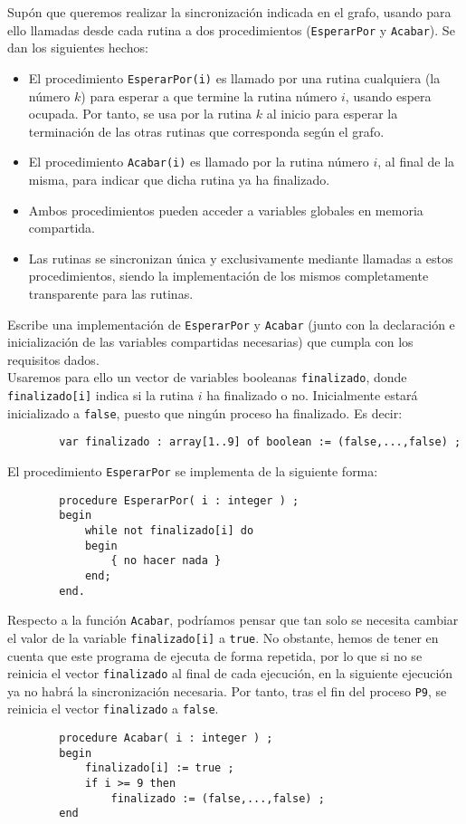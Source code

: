 \begin{ejercicio}
    Supón que queremos realizar la sincronización indicada en el grafo, usando para ello llamadas
    desde cada rutina a dos procedimientos (\verb|EsperarPor| y \verb|Acabar|). Se dan los siguientes hechos:
    \begin{itemize}
        \item El procedimiento \verb|EsperarPor(i)| es llamado por una rutina cualquiera (la número $k$) para esperar a que termine la rutina número $i$, usando espera ocupada. Por tanto, se usa por la rutina $k$ al inicio para esperar la terminación de las otras rutinas que corresponda según el grafo.
        \item El procedimiento \verb|Acabar(i)| es llamado por la rutina número $i$, al final de la misma, para indicar que dicha rutina ya ha finalizado.
        \item Ambos procedimientos pueden acceder a variables globales en memoria compartida.
        \item Las rutinas se sincronizan única y exclusivamente mediante llamadas a estos procedimientos, siendo la implementación de los mismos completamente transparente para las rutinas.
    \end{itemize}
    Escribe una implementación de \verb|EsperarPor| y \verb|Acabar| (junto con la declaración e inicialización de las variables compartidas necesarias) que cumpla con los requisitos dados.\\

    Usaremos para ello un vector de variables booleanas \verb|finalizado|, donde \verb|finalizado[i]| indica si la rutina $i$ ha finalizado o no. Inicialmente estará inicializado a \verb|false|, puesto que ningún proceso ha finalizado. Es decir:
    \begin{verbatim}
        var finalizado : array[1..9] of boolean := (false,...,false) ;
    \end{verbatim}

    El procedimiento \verb|EsperarPor| se implementa de la siguiente forma:
    \begin{verbatim}
        procedure EsperarPor( i : integer ) ;
        begin
            while not finalizado[i] do
            begin
                { no hacer nada }
            end;
        end.
    \end{verbatim}

    Respecto a la función \verb|Acabar|, podríamos pensar que tan solo se necesita cambiar el valor de la variable \verb|finalizado[i]| a \verb|true|. No obstante, hemos de tener en cuenta que este programa de ejecuta de forma repetida, por lo que si no se reinicia el vector \verb|finalizado| al final de cada ejecución, en la siguiente ejecución ya no habrá la sincronización necesaria. Por tanto, tras el fin del proceso \verb|P9|, se reinicia el vector \verb|finalizado| a \verb|false|.
    \begin{verbatim}
        procedure Acabar( i : integer ) ;
        begin
            finalizado[i] := true ;
            if i >= 9 then
                finalizado := (false,...,false) ;
        end
    \end{verbatim}
    

\end{ejercicio}
